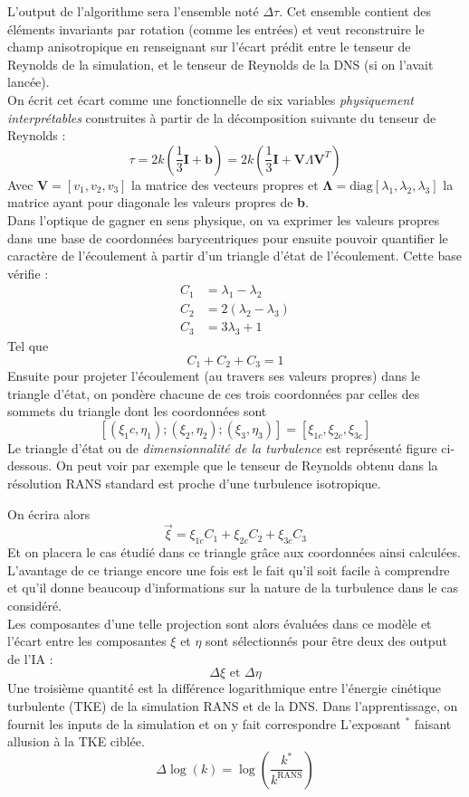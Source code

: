 \documentclass[a4paper,12pt]{report}
\newcommand{\bepar}[1]{
	\left( #1 \right)  
}
\newcommand{\becro}[1]{
	\left[ #1 \right]  
}
\numberwithin{equation}{section} %
\begin{document}
\noindent L'output de l'algorithme sera l'ensemble noté $ \Delta \tau $. Cet ensemble contient des éléments invariants par rotation (comme les entrées) et veut reconstruire le champ anisotropique en renseignant sur l'écart prédit entre le tenseur de Reynolds de la simulation, et le tenseur de Reynolds de la DNS (si on l'avait lancée). \\
On écrit cet écart comme une fonctionnelle de six variables \textit{physiquement interprétables} construites à partir de la décomposition suivante du tenseur de Reynolds :
$$ \tau = 2k\bepar{\frac{1}{3} \textbf{I} + \textbf{b}} = 2k \bepar{\frac{1}{3} \textbf{I} + \textbf{V}\Lambda\textbf{V}^T}$$ 
Avec $\textbf{V} = \becro{v_1, v_2, v_3}$ la matrice des vecteurs propres et $\mathbf{\Lambda} =\text{diag}\becro{\lambda_1, \lambda_2, \lambda_3}$ la matrice ayant pour diagonale les valeurs propres de \textbf{b}.\\
Dans l'optique de gagner en sens physique, on va exprimer les valeurs propres dans une base de coordonnées barycentriques pour ensuite pouvoir quantifier le caractère de l'écoulement à partir d'un triangle d'état de l'écoulement. Cette base vérifie : \begin{align*}
C_1 &= \lambda_1 - \lambda_2\\
C_2 &= 2(\lambda_2 - \lambda_3)\\
C_3 &= 3\lambda_3 +1
\end{align*}
Tel que $$C_1 + C_2 + C_3 = 1 $$  
Ensuite pour projeter l'écoulement (au travers ses valeurs propres) dans le triangle d'état, on pondère chacune de ces trois coordonnées par celles des sommets du triangle dont les coordonnées sont $$\becro{(\xi_1c, \eta_1); (\xi_2, \eta_2); (\xi_3, \eta_3)} = \becro{\xi_{1c}, \xi_{2c}, \xi_{3c}}$$ Le triangle d'état ou de \textit{dimensionnalité de la turbulence} est représenté figure ci-dessous. On peut voir par exemple que le tenseur de Reynolds obtenu dans la résolution RANS standard est proche d'une turbulence isotropique.
%

On écrira alors $$\vec{\xi} = \xi_{1c}C_1 + \xi_{2c}C_2 + \xi_{3c}C_3$$
Et on placera le cas étudié dans ce triangle grâce aux coordonnées ainsi calculées. L'avantage de ce triange encore une fois est le fait qu'il soit facile à comprendre et qu'il donne beaucoup d'informations sur la nature de la turbulence dans le cas considéré.\\
Les composantes d'une telle projection sont alors évaluées dans ce modèle et l'écart entre les composantes $\xi$ et $\eta$ sont sélectionnés pour être deux des output de l'IA : $$\Delta \xi\text{ et }\Delta \eta$$
  Une troisième quantité est la différence logarithmique entre l'énergie cinétique turbulente (TKE) de la simulation RANS et de la DNS. Dans l'apprentissage, on fournit les inputs de la simulation et on y fait correspondre L'exposant $^*$ faisant allusion à la TKE ciblée. $$\Delta \log(k) = \log\bepar{\frac{k^*}{k^{\text{RANS}}}}$$ 
  
\end{document}
